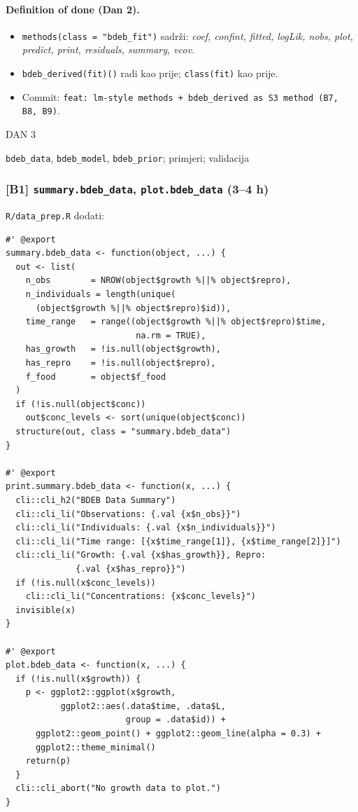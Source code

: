 \documentclass[11pt,a4paper]{article}
\newcommand{\dayhead}[2]{%
  \vspace{0.6em}\par\noindent%
  \colorbox{daygray}{\color{white}\bfseries\strut\;DAN #1\;}\;%
  \colorbox{daylight}{\color{daygray}\strut\;#2\;}\par\vspace{0.4em}%
}
\newcommand{\file}[1]{\texttt{\small #1}}
\newcommand{\fn}[1]{\texttt{\small #1()}}
\newcommand{\code}[1]{\texttt{\small #1}}
\begin{document}
\paragraph{Definition of done (Dan 2).}
\begin{itemize}[leftmargin=1.4em,nosep]
  \item \code{methods(class = "bdeb\_fit")} sadrži:
    \emph{coef, confint, fitted, logLik, nobs, plot, predict,
    print, residuals, summary, vcov}.
  \item \fn{bdeb\_derived(fit)} radi kao prije; \code{class(fit)} kao
    prije.
  \item Commit: \code{feat: lm-style methods + bdeb\_derived as S3
    method (B7, B8, B9)}.
\end{itemize}

\dayhead{3}{\texttt{bdeb\_data}, \texttt{bdeb\_model},
\texttt{bdeb\_prior}; primjeri; validacija}

\subsubsection*{[B1] \texttt{summary.bdeb\_data}, \texttt{plot.bdeb\_data}
(3--4 h)}

\file{R/data\_prep.R} dodati:

\begin{lstlisting}
#' @export
summary.bdeb_data <- function(object, ...) {
  out <- list(
    n_obs        = NROW(object$growth %||% object$repro),
    n_individuals = length(unique(
      (object$growth %||% object$repro)$id)),
    time_range   = range((object$growth %||% object$repro)$time,
                          na.rm = TRUE),
    has_growth   = !is.null(object$growth),
    has_repro    = !is.null(object$repro),
    f_food       = object$f_food
  )
  if (!is.null(object$conc))
    out$conc_levels <- sort(unique(object$conc))
  structure(out, class = "summary.bdeb_data")
}

#' @export
print.summary.bdeb_data <- function(x, ...) {
  cli::cli_h2("BDEB Data Summary")
  cli::cli_li("Observations: {.val {x$n_obs}}")
  cli::cli_li("Individuals: {.val {x$n_individuals}}")
  cli::cli_li("Time range: [{x$time_range[1]}, {x$time_range[2]}]")
  cli::cli_li("Growth: {.val {x$has_growth}}, Repro:
              {.val {x$has_repro}}")
  if (!is.null(x$conc_levels))
    cli::cli_li("Concentrations: {x$conc_levels}")
  invisible(x)
}

#' @export
plot.bdeb_data <- function(x, ...) {
  if (!is.null(x$growth)) {
    p <- ggplot2::ggplot(x$growth,
           ggplot2::aes(.data$time, .data$L,
                        group = .data$id)) +
      ggplot2::geom_point() + ggplot2::geom_line(alpha = 0.3) +
      ggplot2::theme_minimal()
    return(p)
  }
  cli::cli_abort("No growth data to plot.")
}
\end{lstlisting}
\end{document}
